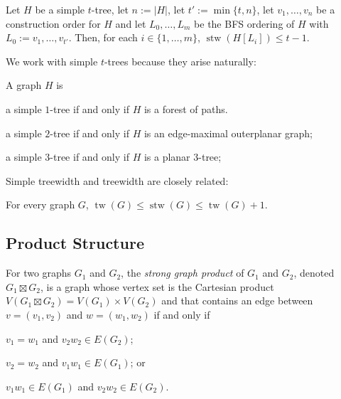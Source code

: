 \documentclass[kpfonts]{patmorin}
\DeclareMathOperator{\tw}{tw}
\DeclareMathOperator{\stw}{stw}
\theoremstyle{named}
\begin{document}
%

\begin{clm}\label{simple-bfs-layers}
    Let $H$ be a simple $t$-tree, let $n:=|H|$, let $t':=\min\{t,n\}$, let $v_1,\ldots,v_n$ be a construction order for $H$ and let $L_0,\ldots,L_m$ be the BFS ordering of $H$ with $L_0:=v_1,\ldots,v_{t'}$.   Then, for each $i\in\{1,\ldots,m\}$, $\stw(H[L_i])\le t-1$.
\end{clm}

We work with simple $t$-trees because they arise naturally:

\begin{clm}\label{simple-small-cases}
    A graph $H$ is
    \begin{compactenum}[(i)]
        \item a simple $1$-tree if and only if $H$ is a forest of paths.
        \item a simple $2$-tree if and only if $H$ is an edge-maximal outerplanar graph;
        \item a simple $3$-tree if and only if $H$ is a planar 3-tree;
    \end{compactenum}
\end{clm}

Simple treewidth and treewidth are closely related:

\begin{clm}\label{simple-treewidth-vs-treewidth}
    For every graph $G$, $\tw(G)\le \stw(G)\le \tw(G)+1$.
\end{clm}

\subsection{Product Structure}

For two graphs $G_1$ and $G_2$, the \emph{strong graph product} of $G_1$ and $G_2$, denoted $G_1\boxtimes G_2$, is a graph whose vertex set is the Cartesian product $V(G_1\boxtimes G_2)= V(G_1)\times V(G_2)$ and that contains an edge between $v=(v_1,v_2)$ and $w=(w_1,w_2)$ if and only if
\begin{inparaenum}[(i)]
    \item $v_1=w_1$ and $v_2w_2\in E(G_2)$;
    \item $v_2=w_2$ and $v_1w_1\in E(G_1)$; or
    \item $v_1w_1\in E(G_1)$ and $v_2w_2\in E(G_2)$.
\end{inparaenum}
\end{document}
